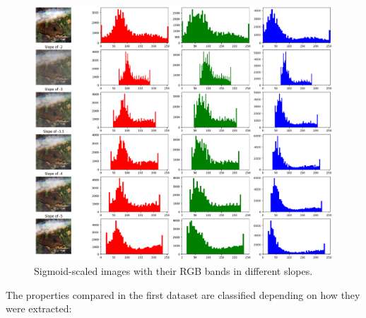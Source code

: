 \documentclass[11pt, a4paper]{article}
\begin{document}
	\begin{figure}[H]
		\centering
		\includegraphics[width=16cm]{imgs/eda/sigmoid-slope}
		\caption{Sigmoid-scaled images with their RGB bands in different slopes.}
		\label{fig:eda-sigmoid-slope}
	\end{figure}
	The properties compared in the first dataset are classified depending on how they were extracted:
\end{document}
